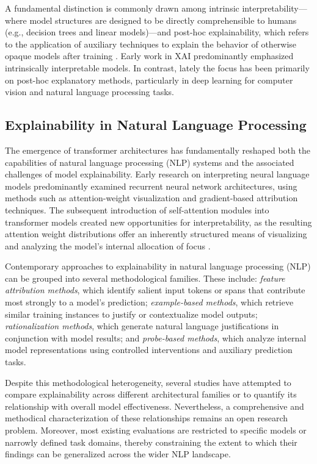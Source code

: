 \documentclass[preprint,12pt]{elsarticle}
\begin{document}
A fundamental distinction is commonly drawn among intrinsic interpretability—where model structures are designed to be directly comprehensible to humans (e.g., decision trees and linear models)—and post-hoc explainability, which refers to the application of auxiliary techniques to explain the behavior of otherwise opaque models after training \cite{lipton2018mythos}. Early work in XAI predominantly emphasized intrinsically interpretable models. In contrast, lately the focus has been primarily on post-hoc explanatory methods, particularly in deep learning for computer vision and natural language processing tasks.

\subsection{Explainability in Natural Language Processing}

The emergence of transformer architectures has fundamentally reshaped both the capabilities of natural language processing (NLP) systems and the associated challenges of model explainability. Early research on interpreting neural language models predominantly examined recurrent neural network architectures, using methods such as attention-weight visualization \cite{bahdanau2014neural} and gradient-based attribution techniques. The subsequent introduction of self-attention modules into transformer models created new opportunities for interpretability, as the resulting attention weight distributions offer an inherently structured means of visualizing and analyzing the model's internal allocation of focus \cite{vaswani2017attention}.

Contemporary approaches to explainability in natural language processing (NLP) can be grouped into several methodological families. These include: \textit{feature attribution methods}, which identify salient input tokens or spans that contribute most strongly to a model's prediction; \textit{example-based methods}, which retrieve similar training instances to justify or contextualize model outputs; \textit{rationalization methods}, which generate natural language justifications in conjunction with model results; and \textit{probe-based methods}, which analyze internal model representations using controlled interventions and auxiliary prediction tasks.

Despite this methodological heterogeneity, several studies have attempted to compare explainability across different architectural families or to quantify its relationship with overall model effectiveness. Nevertheless, a comprehensive and methodical characterization of these relationships remains an open research problem. Moreover, most existing evaluations are restricted to specific models or narrowly defined task domains, thereby constraining the extent to which their findings can be generalized across the wider NLP landscape.
\end{document}
